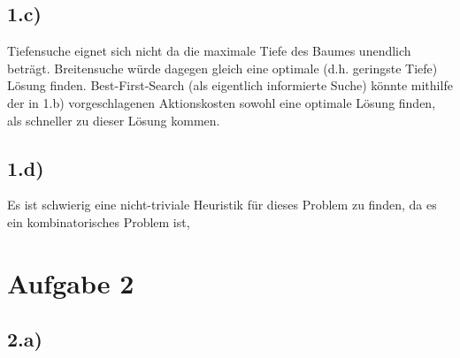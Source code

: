 \documentclass[a4paper]{article}
\begin{document}
\subsection*{1.c)}
Tiefensuche eignet sich nicht da die maximale Tiefe des Baumes unendlich beträgt. Breitensuche würde dagegen gleich eine optimale (d.h. geringste Tiefe) Lösung finden. Best-First-Search (als eigentlich informierte Suche) könnte mithilfe der in 1.b) vorgeschlagenen Aktionskosten sowohl eine optimale Lösung finden, als schneller zu dieser Lösung kommen. 

\subsection*{1.d)}
Es ist schwierig eine nicht-triviale Heuristik für dieses Problem zu finden, da es ein kombinatorisches Problem ist,

\section*{Aufgabe 2}
\subsection*{2.a)}
\end{document}
